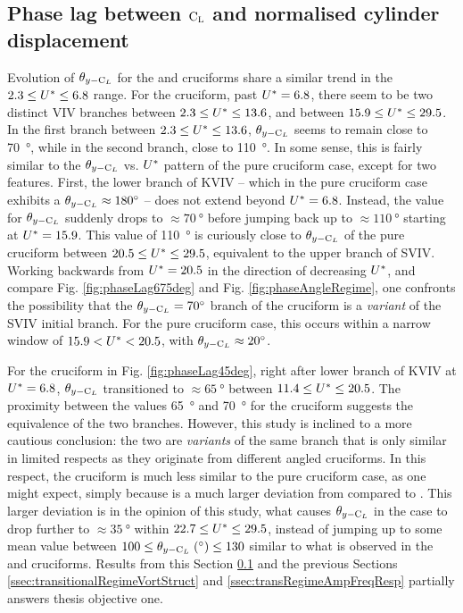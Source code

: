 \documentclass[oneside]{utmthesis}
\begin{document}
\subsection{Phase lag between $\text{C}_{\text{L}}$ and normalised cylinder displacement} \label{ssec:phaseLag67545}

Evolution of $\theta_{y-\text{C}_{L}}$ for the \angfo{} and \angth{} cruciforms share a similar trend in the $2.3 \leq U^{*} \leq 6.8$ range. For the \angfo{} cruciform, past $U^{*} = 6.8$, there seem to be two distinct VIV branches between $2.3 \leq U^{*} \leq 13.6$, and between $15.9 \leq U^{*} \leq 29.5$. In the first branch between $2.3 \leq U^{*} \leq 13.6$, $\theta_{y-\text{C}_{L}}$ seems to remain close to \SI{70}{\degree}, while in the second branch, close to \SI{110}{\degree}. In some sense, this is fairly similar to the $\theta_{y-\text{C}_{L}}$ vs. $U^{*}$ pattern of the pure cruciform case, except for two features. First, the lower branch of KVIV -- which in the pure cruciform case exhibits a $\plag \approx \SI{180}{\degree}$ -- does not extend beyond $U^{*} = 6.8$. Instead, the value for $\theta_{y-\text{C}_{L}}$ suddenly drops to $\approx \SI{70}{\degree}$ before jumping back up to $\approx \SI{110}{\degree}$ starting at $U^{*} = 15.9$. This value of \SI{110}{\degree} is curiously close to $\theta_{y-\text{C}_{L}}$ of the pure cruciform between $20.5 \leq U^{*} \leq 29.5$, equivalent to the upper branch of SVIV. Working backwards from $U^{*} = 20.5$ in the direction of decreasing $U^{*}$, and compare Fig. \ref{fig:phaseLag675deg} and Fig. \ref{fig:phaseAngleRegime}, one confronts the possibility that the $\plag = \SI{70}{\degree}$ branch of the \angfo cruciform is a \textit{variant} of the SVIV initial branch. For the pure cruciform case, this occurs within a narrow window of $15.9 < U^{*} < 20.5$, with $\plag \approx \SI{20}{\degree}$.

For the \angth{} cruciform in Fig. \ref{fig:phaseLag45deg}, right after lower branch of KVIV at $U^{*} = 6.8$, $\theta_{y-\text{C}_{L}}$ transitioned to $\approx \SI{65}{\degree}$ between $11.4 \leq U^{*} \leq 20.5$. The proximity between the values \SI{65}{\degree} and \SI{70}{\degree} for the \angfo{} cruciform suggests the equivalence of the two branches. However, this study is inclined to a more cautious conclusion: the two are \textit{variants} of the same branch that is only similar in limited respects as they originate from different angled cruciforms. In this respect, the \angth{} cruciform is much less similar to the pure cruciform case, as one might expect, simply because \angth{} is a much larger deviation from \angfi{} compared to \angfo{}. This larger deviation is in the opinion of this study, what causes $\theta_{y-\text{C}_{L}}$ in the \angth{} case to drop further to $\approx \SI{35}{\degree}$ within $22.7 \leq U^{*} \leq 29.5$, instead of jumping up to some mean value between $100 \leq \plag \; (\si{\degree}) \leq 130$ similar to what is observed in the \angfi{} and \angfo{} cruciforms. Results from this Section \ref{ssec:phaseLag67545} and the previous Sections \ref{ssec:transitionalRegimeVortStruct} and \ref{ssec:transRegimeAmpFreqResp} partially answers thesis objective one.
\end{document}
